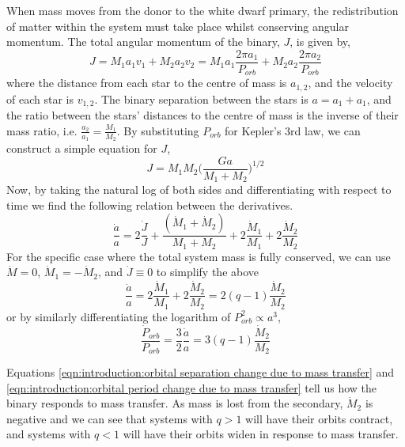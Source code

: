 When mass moves from the donor to the white dwarf primary, the redistribution of matter within the system must take place whilst conserving angular momentum. The total angular momentum of the binary, $J$, is given by,
\begin{equation}
    J = M_1 a_1 v_1 + M_2 a_2 v_2 = M_1 a_1 \frac{2\pi a_1}{P_{orb}} + M_2 a_2 \frac{2\pi a_2}{P_{orb}}
\end{equation}
where the distance from each star to the centre of mass is $a_{1,2}$, and the velocity of each star is $v_{1,2}$.
The binary separation between the stars is $a = a_1 + a_1$, and the ratio between the stars' distances to the centre of mass is the inverse of their mass ratio, i.e. $\frac{a_2}{a_1} = \frac{M_1}{M_2}$. By substituting $P_{orb}$ for Kepler's 3rd law, we can construct a simple equation for $J$,
\begin{equation}
    J = M_1 M_2 \bigg( \frac{Ga}{M_1 + M_2} \bigg)^{1/2}
\end{equation}
Now, by taking the natural log of both sides and differentiating with respect to time we find the following relation between the derivatives.
\begin{equation}
    \frac{\dot a}{a} = 2\frac{\dot J}{J} + \frac{(\dot M_1+\dot M_2)}{M_1+M_2} + 2\frac{\dot M_1}{M_1} + 2\frac{\dot M_2}{M_2}
\end{equation}
For the specific case where the total system mass is fully conserved, we can use $\dot M = 0$, $\dot M_1 = -\dot M_2$, and $\dot J \equiv 0$ to simplify the above
\begin{equation}
    \label{eqn:introduction:orbital separation change due to mass transfer}
    \frac{\dot a}{a} = 2\frac{\dot M_1}{M_1} + 2\frac{\dot M_2}{M_2} = 2(q-1) \frac{\dot M_2}{M_2}
\end{equation}
or by similarly differentiating the logarithm of $P_{orb}^2 \propto a^3$,
\begin{equation}
    \label{eqn:introduction:orbital period change due to mass transfer}
    \frac{\dot P_{orb}}{P_{orb}} = \frac{3}{2}\frac{\dot a}{a} = 3(q-1) \frac{\dot M_2}{M_2}
\end{equation}

Equations \ref{eqn:introduction:orbital separation change due to mass transfer} and \ref{eqn:introduction:orbital period change due to mass transfer} tell us how the binary responds to mass transfer. As mass is lost from the secondary, $\dot M_2$ is negative and we can see that systems with $q>1$ will have their orbits contract, and systems with $q<1$ will have their orbits widen in response to mass transfer.


